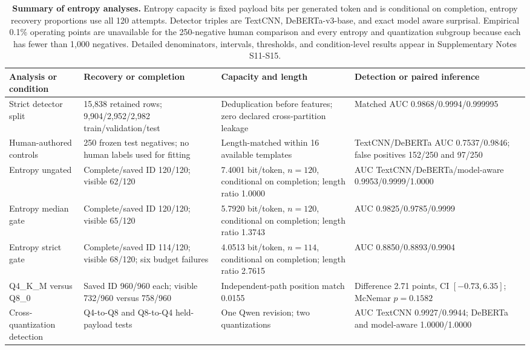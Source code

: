 \documentclass[fleqn,10pt]{wlscirep}
\begin{document}
\begin{table}[H]
\centering
\footnotesize
\setlength{\tabcolsep}{3pt}
\begin{tabularx}{\textwidth}{L{0.17\textwidth}L{0.25\textwidth}L{0.24\textwidth}Y}
\toprule
Analysis or condition & Recovery or completion & Capacity and length & Detection or paired inference \\
\midrule
Strict detector split & 15,838 retained rows; 9,904/2,952/2,982 train/validation/test & Deduplication before features; zero declared cross-partition leakage & Matched AUC 0.9868/0.9994/0.999995 \\
Human-authored controls & 250 frozen test negatives; no human labels used for fitting & Length-matched within 16 available templates & TextCNN/DeBERTa AUC 0.7537/0.9846; false positives 152/250 and 97/250 \\
Entropy ungated & Complete/saved ID 120/120; visible 62/120 & 7.4001 bit/token, \(n=120\), conditional on completion; length ratio 1.0000 & AUC TextCNN/DeBERTa/model-aware 0.9953/0.9999/1.0000 \\
Entropy median gate & Complete/saved ID 120/120; visible 65/120 & 5.7920 bit/token, \(n=120\), conditional on completion; length ratio 1.3743 & AUC 0.9825/0.9785/0.9999 \\
Entropy strict gate & Complete/saved ID 114/120; visible 68/120; six budget failures & 4.0513 bit/token, \(n=114\), conditional on completion; length ratio 2.7615 & AUC 0.8850/0.8893/0.9904 \\
Q4\_K\_M versus Q8\_0 & Saved ID 960/960 each; visible 732/960 versus 758/960 & Independent-path position match 0.0155 & Difference 2.71 points, CI \([-0.73,6.35]\); McNemar \(p=0.1582\) \\
Cross-quantization detection & Q4-to-Q8 and Q8-to-Q4 held-payload tests & One Qwen revision; two quantizations & AUC TextCNN 0.9927/0.9944; DeBERTa and model-aware 1.0000/1.0000 \\
\bottomrule
\end{tabularx}
\caption{\label{tab:v3-summary}\textbf{Summary of entropy analyses.} Entropy capacity is fixed payload bits per generated token and is conditional on completion, entropy recovery proportions use all 120 attempts. Detector triples are TextCNN, DeBERTa-v3-base, and exact model aware surprisal. Empirical 0.1\% operating points are unavailable for the 250-negative human comparison and every entropy and quantization subgroup because each has fewer than 1,000 negatives. Detailed denominators, intervals, thresholds, and condition-level results appear in Supplementary Notes S11-S15.}
\end{table}
\end{document}
